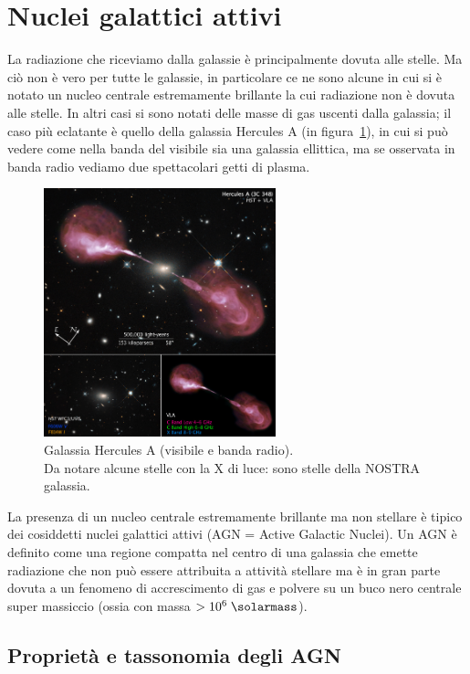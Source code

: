\section{Nuclei galattici attivi} \label{sec:nuclei-galattici-attivi}
La radiazione che riceviamo dalla galassie è principalmente dovuta alle stelle. Ma ciò non è vero per tutte le galassie, in particolare ce ne sono alcune in cui si è notato un nucleo centrale estremamente brillante la cui radiazione non è dovuta alle stelle. In altri casi si sono notati delle masse di gas uscenti dalla galassia; il caso più eclatante è quello della galassia Hercules A (in figura~\ref{fig:hercules-a}), in cui si può vedere come nella banda del visibile sia una galassia ellittica, ma se osservata in banda radio vediamo due spettacolari getti di plasma.

\begin{figure}
    \centering
    \includegraphics[width = 0.6\textwidth]{immagini/hercules-a.png}
    \caption{Galassia Hercules A (visibile e banda radio). \\ Da notare alcune stelle con la X di luce: sono stelle della NOSTRA galassia.}
    \label{fig:hercules-a}
\end{figure}

La presenza di un nucleo centrale estremamente brillante ma non stellare è tipico dei cosiddetti nuclei galattici attivi (AGN = Active Galactic Nuclei). Un AGN è definito come una regione compatta nel centro di una galassia che emette radiazione che non può essere attribuita a attività stellare ma è in gran parte dovuta a un fenomeno di accrescimento di gas e polvere su un buco nero centrale super massiccio (ossia con massa $> 10^6 \;\si{\solarmass}$). 

\subsection{Proprietà e tassonomia degli AGN}

